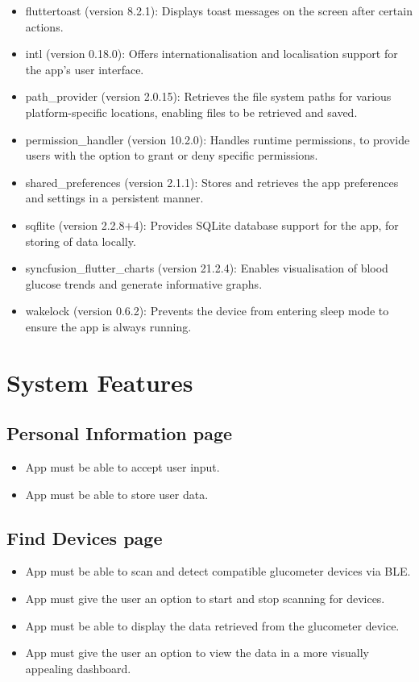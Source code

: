 \documentclass[a4paper]{scrreprt}
\begin{document}
\begin{itemize}
\begin{itemize}
        \item fluttertoast (version 8.2.1): Displays toast messages on the screen after certain actions.
        \item intl (version 0.18.0): Offers internationalisation and localisation support for the app's user interface.
        \item path\_provider (version 2.0.15): Retrieves the file system paths for various platform-specific locations, enabling files to be retrieved and saved.
        \item permission\_handler (version 10.2.0): Handles runtime permissions, to provide users with the option to grant or deny specific permissions.
        \item shared\_preferences (version 2.1.1): Stores and retrieves the app preferences and settings in a persistent manner.
        \item sqflite (version 2.2.8+4): Provides SQLite database support for the app, for storing of data locally.
        \item syncfusion\_flutter\_charts (version 21.2.4): Enables visualisation of blood glucose trends and generate informative graphs.
        \item wakelock (version 0.6.2): Prevents the device from entering sleep mode to ensure the app is always running.
    \end{itemize}
\end{itemize}

\chapter{System Features}

\section{Personal Information page}
\begin{itemize}
    \item App must be able to accept user input.
    \item App must be able to store user data.
\end{itemize}
\section{Find Devices page}
\begin{itemize}
    \item App must be able to scan and detect compatible glucometer devices via BLE.
    \item App must give the user an option to start and stop scanning for devices.
    \item App must be able to display the data retrieved from the glucometer device.
    \item App must give the user an option to view the data in a more visually appealing dashboard.
\end{itemize}
\end{document}
